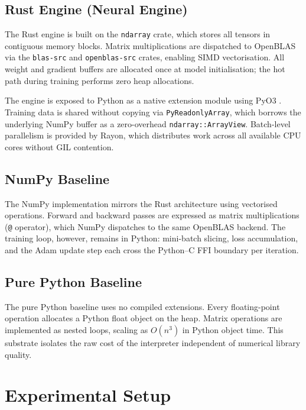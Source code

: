 \documentclass[11pt]{article}
\begin{document}
\subsection{Rust Engine (Neural Engine)}

The Rust engine is built on the \texttt{ndarray} crate, which stores all tensors in contiguous memory blocks. Matrix multiplications are dispatched to OpenBLAS via the \texttt{blas-src} and \texttt{openblas-src} crates, enabling SIMD vectorisation. All weight and gradient buffers are allocated once at model initialisation; the hot path during training performs zero heap allocations.

The engine is exposed to Python as a native extension module using PyO3 \cite{pyo3}. Training data is shared without copying via \texttt{PyReadonlyArray}, which borrows the underlying NumPy buffer as a zero-overhead \texttt{ndarray::ArrayView}. Batch-level parallelism is provided by Rayon, which distributes work across all available CPU cores without GIL contention.

\subsection{NumPy Baseline}

The NumPy implementation mirrors the Rust architecture using vectorised operations. Forward and backward passes are expressed as matrix multiplications (\texttt{@} operator), which NumPy dispatches to the same OpenBLAS backend. The training loop, however, remains in Python: mini-batch slicing, loss accumulation, and the Adam update step each cross the Python--C FFI boundary per iteration.

\subsection{Pure Python Baseline}

The pure Python baseline uses no compiled extensions. Every floating-point operation allocates a Python float object on the heap. Matrix operations are implemented as nested loops, scaling as $O(n^3)$ in Python object time. This substrate isolates the raw cost of the interpreter independent of numerical library quality.

\section{Experimental Setup}
\end{document}
